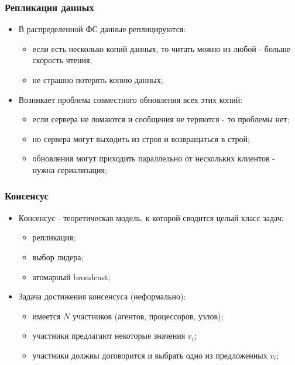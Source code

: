 \begin{frame}
\frametitle{Репликация данных}
\begin{itemize}
  \item<1-> В распределенной ФС данные реплицируются:
    \begin{itemize}
      \item если есть несколько копий данных, то читать можно из любой - больше скорость чтения;
      \item не страшно потерять копию данных;
    \end{itemize}
  \item<2-> Возникает проблема совместного обновления всех этих копий:
    \begin{itemize}
      \item если сервера не ломаются и сообщения не теряются - то проблемы нет;
      \item но сервера могут выходить из строя и возвращаться в строй;
      \item обновления могут приходить параллельно от нескольких клиентов - нужна сериализация;
    \end{itemize}
\end{itemize}
\end{frame}

\begin{frame}
\frametitle{Консенсус}
\begin{itemize}
  \item<1-> Консенсус - теоретическая модель, к которой сводится целый класс задач:
    \begin{itemize}
      \item репликация;
      \item выбор лидера;
      \item атомарный broadcast;
    \end{itemize}
  \item<2-> Задача достижения консенсуса (неформально):
    \begin{itemize}
      \item имеется $N$ участников (агентов, процессоров, узлов);
      \item участники предлагают некоторые значения $v_i$;
      \item участники должны договорится и выбрать одно из предложенных $v_i$;
    \end{itemize}
\end{itemize}
\end{frame}

